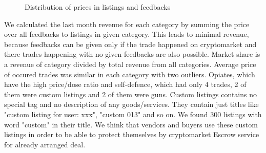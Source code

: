 \documentclass[
  digital, %
  table,   %
  lof,     %
  lot,     %
  oneside
]{fithesis3}
\begin{document}
\begin{figure}[!htb]
\label{listingxprice}
    
\caption[justification=centering]{Distribution of prices in listings and feedbacks\newline }
\end{figure}

We calculated the last month revenue for each category
by summing the price over all feedbacks to listings in given category.
This leads to minimal revenue, because feedbacks
can be given only if the trade happened on cryptomarket and there
trades happening with no given feedbacks are also possible.
Market share is a revenue of category divided by total revenue from all categories.
Average price of occured trades was similar in each category
with two outliers. Opiates, which have the high price/dose ratio and 
self-defence, which had only 4 trades, 2 of them were custom listings and 2 of them were guns.
Custom listings contains no special tag and no description of any goods/services.
They contain just titles like "custom listing for user: xxx", "custom 013" and so on.
We found 300 listings with word "custom" in their title. 
We think that vendors and buyers use these custom listings in order to be able to protect themselves
by cryptomarket Escrow service for already arranged deal.
\end{document}

